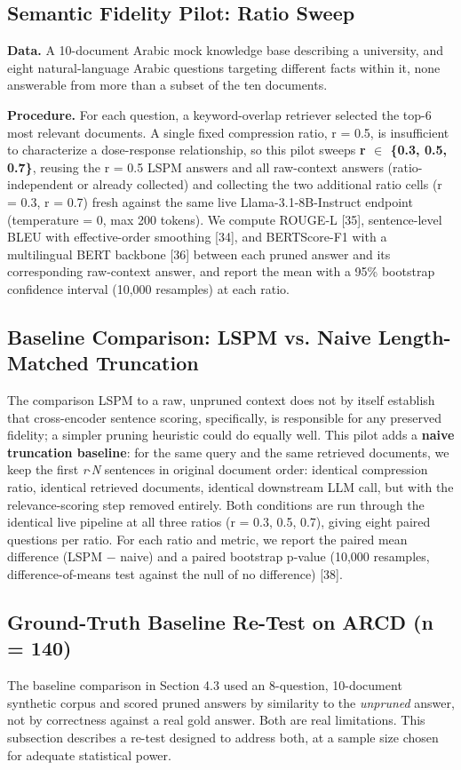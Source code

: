 \subsection{Semantic Fidelity Pilot: Ratio Sweep}
\textbf{Data.} A 10-document Arabic mock knowledge base describing a university, and eight natural-language Arabic questions targeting different facts within it, none answerable from more than a subset of the ten documents.

\textbf{Procedure.} For each question, a keyword-overlap retriever selected the top-6 most relevant documents. A single fixed compression ratio, r = 0.5, is insufficient to characterize a dose-response relationship, so this pilot sweeps \textbf{r $\in$ \{0.3, 0.5, 0.7\}}, reusing the r = 0.5 LSPM answers and all raw-context answers (ratio-independent or already collected) and collecting the two additional ratio cells (r = 0.3, r = 0.7) fresh against the same live Llama-3.1-8B-Instruct endpoint (temperature = 0, max 200 tokens). We compute ROUGE-L [35], sentence-level BLEU with effective-order smoothing [34], and BERTScore-F1 with a multilingual BERT backbone [36] between each pruned answer and its corresponding raw-context answer, and report the mean with a 95\% bootstrap confidence interval (10,000 resamples) at each ratio.

\subsection{Baseline Comparison: LSPM vs. Naive Length-Matched Truncation}
The comparison LSPM to a raw, unpruned context does not by itself establish that cross-encoder sentence scoring, specifically, is responsible for any preserved fidelity; a simpler pruning heuristic could do equally well. This pilot adds a \textbf{naive truncation baseline}: for the same query and the same retrieved documents, we keep the first \textit{r}$\cdot$\textit{N} sentences in original document order: identical compression ratio, identical retrieved documents, identical downstream LLM call, but with the relevance-scoring step removed entirely. Both conditions are run through the identical live pipeline at all three ratios (r = 0.3, 0.5, 0.7), giving eight paired questions per ratio. For each ratio and metric, we report the paired mean difference (LSPM $-$ naive) and a paired bootstrap p-value (10,000 resamples, difference-of-means test against the null of no difference) [38].

\subsection{Ground-Truth Baseline Re-Test on ARCD (n = 140)}
The baseline comparison in Section 4.3 used an 8-question, 10-document synthetic corpus and scored pruned answers by similarity to the \textit{unpruned} answer, not by correctness against a real gold answer. Both are real limitations. This subsection describes a re-test designed to address both, at a sample size chosen for adequate statistical power.

